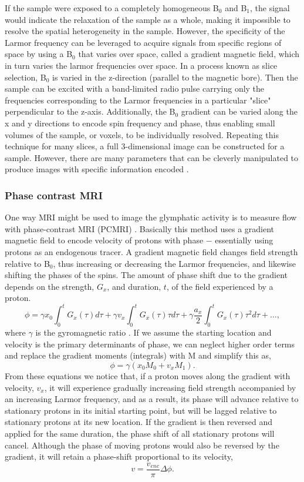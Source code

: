 If the sample were exposed to a completely homogeneous B$_0$ and B$_1$, the signal would indicate the relaxation of the sample as a whole, making it impossible to resolve the spatial heterogeneity in the sample. However, the specificity of the Larmor frequency can be leveraged to acquire signals from specific regions of space by using a B$_0$ that varies over space, called a gradient magnetic field, which in turn varies the larmor frequencies over space. In a process known as slice selection, B$_0$ is varied in the z-direction (parallel to the magnetic bore). Then the sample can be excited with a band-limited radio pulse carrying only the frequencies corresponding to the Larmor frequencies in a particular "slice" perpendicular to the z-axis. Additionally, the B$_0$ gradient can be varied along the x and y directions to encode spin frequency and phase, thus enabling small volumes of the sample, or voxels, to be individually resolved. Repeating this technique for many slices, a full 3-dimensional image can be constructed for a sample. However, there are many parameters that can be cleverly manipulated to produce images with specific information encoded \citep{Huettel}.

\subsubsection{Phase contrast MRI}
One way MRI might be used to image the glymphatic activity is to measure flow with phase-contrast MRI (PCMRI) \citep{Hahn1960, Moran1982}. Basically this method uses a gradient magnetic field to encode velocity of protons with phase $-$ essentially using protons as an endogenous tracer. A gradient magnetic field changes field strength relative to B$_0$, thus increasing or decreasing the Larmor frequencies, and likewise shifting the phases of the spins. The amount of phase shift due to the gradient depends on the strength, $G_x$, and duration, $t$, of the field experienced by a proton. 
$$\phi =\gamma x_{0}\int _{0}^{t}G_{x}(\tau )d\tau +\gamma v_{x}\int _{0}^{t}G_{x}(\tau )\tau d\tau +\gamma {\frac {a_{x}}{2}}\int _{0}^{t}G_{x}(\tau )\tau ^{2}d\tau +\ldots,$$
where $\gamma$ is the gyromagnetic ratio \citep{Huettel}. If we assume the starting location and velocity is the primary determinants of phase, we can neglect higher order terms and replace the gradient moments (integrals) with M and simplify this as,
$$\phi =\gamma (x_{0}M_{0}+v_{x}M_{1}).$$ 
From these equations we notice that, if a proton moves along the gradient with velocity, $v_x$, it will experience gradually increasing field strength accompanied by an increasing Larmor frequency, and as a result, its phase will advance relative to stationary protons in its initial starting point, but will be lagged relative to stationary protons at its new location. If the gradient is then reversed and applied for the same duration, the phase shift of all stationary protons will cancel. Although the phase of moving protons would also be reversed by the gradient, it will retain a phase-shift proportional to its velocity, 
$$v = \dfrac{v_{enc}}{\pi}\Delta\phi.$$

